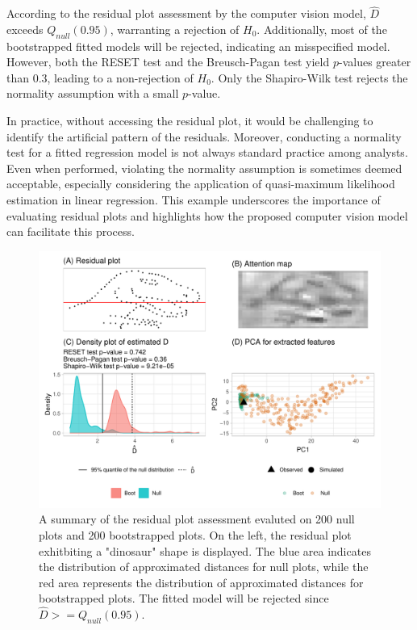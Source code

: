 \documentclass[]{interact}
\theoremstyle{plain}%
\theoremstyle{definition}
\theoremstyle{remark}
\begin{document}
According to the residual plot assessment by the computer vision model,
\(\hat{D}\) exceeds \(Q_{null}(0.95)\), warranting a rejection of
\(H_0\). Additionally, most of the bootstrapped fitted models will be
rejected, indicating an misspecified model. However, both the RESET test
and the Breusch-Pagan test yield \(p\)-values greater than 0.3, leading
to a non-rejection of \(H_0\). Only the Shapiro-Wilk test rejects the
normality assumption with a small \(p\)-value.

In practice, without accessing the residual plot, it would be
challenging to identify the artificial pattern of the residuals.
Moreover, conducting a normality test for a fitted regression model is
not always standard practice among analysts. Even when performed,
violating the normality assumption is sometimes deemed acceptable,
especially considering the application of quasi-maximum likelihood
estimation in linear regression. This example underscores the importance
of evaluating residual plots and highlights how the proposed computer
vision model can facilitate this process.

\begin{figure}[!h]

{\centering \includegraphics[width=1\linewidth]{paper_files/figure-latex/dino-check-1} 

}

\caption{A summary of the residual plot assessment evaluted on 200 null plots and 200 bootstrapped plots. On the left, the residual plot exhitbiting a "dinosaur" shape is displayed. The blue area indicates the distribution of approximated distances for null plots, while the red area represents the distribution of approximated distances for bootstrapped plots. The fitted model will be rejected since $\hat{D} >= Q_{null}(0.95)$.}\label{fig:dino-check}
\end{figure}
\end{document}

